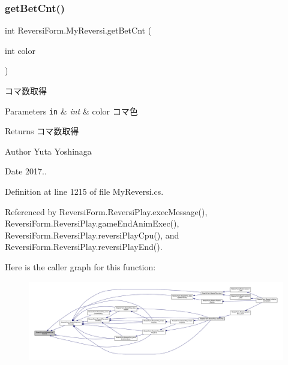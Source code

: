 \subsubsection{\texorpdfstring{get\+Bet\+Cnt()}{getBetCnt()}}
{\footnotesize\ttfamily int Reversi\+Form.\+My\+Reversi.\+get\+Bet\+Cnt (\begin{DoxyParamCaption}\item[{int}]{color }\end{DoxyParamCaption})}



コマ数取得 


\begin{DoxyParams}[1]{Parameters}
\mbox{\tt in}  & {\em int} & color コマ色 \\
\hline
\end{DoxyParams}
\begin{DoxyReturn}{Returns}
コマ数取得 
\end{DoxyReturn}
\begin{DoxyAuthor}{Author}
Yuta Yoshinaga 
\end{DoxyAuthor}
\begin{DoxyDate}{Date}
2017.. 
\end{DoxyDate}


Definition at line 1215 of file My\+Reversi.\+cs.



Referenced by Reversi\+Form.\+Reversi\+Play.\+exec\+Message(), Reversi\+Form.\+Reversi\+Play.\+game\+End\+Anim\+Exec(), Reversi\+Form.\+Reversi\+Play.\+reversi\+Play\+Cpu(), and Reversi\+Form.\+Reversi\+Play.\+reversi\+Play\+End().

Here is the caller graph for this function\+:
\nopagebreak
\begin{figure}[H]
\begin{center}
\leavevmode
\includegraphics[width=350pt]{class_reversi_form_1_1_my_reversi_aa69640136727deb89addafae8e8e54cb_icgraph}
\end{center}
\end{figure}
\mbox{\label{class_reversi_form_1_1_my_reversi_a960e2691d2d106e5ad6036cfe9cf2503}} 
